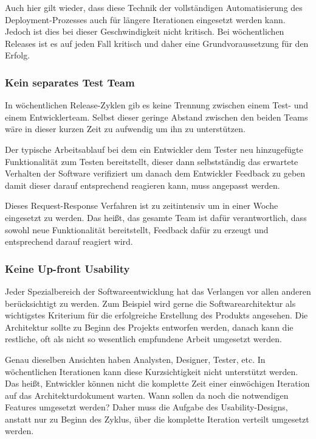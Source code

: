 Auch hier gilt wieder, dass diese Technik der vollständigen Automatisierung des Deployment-Prozesses auch für längere Iterationen eingesetzt werden kann. Jedoch ist dies bei dieser Geschwindigkeit nicht kritisch. Bei wöchentlichen Releases ist es auf jeden Fall kritisch und daher eine Grundvoraussetzung für den Erfolg.

\subsubsection{Kein separates Test Team}
In wöchentlichen Release-Zyklen gib es keine Trennung zwischen einem Test- und einem Entwicklerteam. Selbst dieser geringe Abstand zwischen den beiden Teams wäre in dieser kurzen Zeit zu aufwendig um ihn zu unterstützen. 

Der typische Arbeitsablauf bei dem ein Entwickler dem Tester neu hinzugefügte Funktionalität zum Testen bereitstellt, dieser dann selbstständig das erwartete Verhalten der Software verifiziert um danach dem Entwickler Feedback zu geben damit dieser darauf entsprechend reagieren kann, muss angepasst werden. 

Dieses Request-Response Verfahren ist zu zeitintensiv um in einer Woche eingesetzt zu werden. Das heißt, das gesamte Team ist dafür verantwortlich, dass sowohl neue Funktionalität bereitstellt, Feedback dafür zu erzeugt und entsprechend darauf reagiert wird.

\subsubsection{Keine Up-front Usability}
Jeder Spezialbereich der Softwareentwicklung hat das Verlangen vor allen anderen berücksichtigt zu werden. Zum Beispiel wird gerne die Softwarearchitektur als wichtigstes Kriterium für die erfolgreiche Erstellung des Produkts angesehen. Die Architektur sollte zu Beginn des Projekts entworfen werden, danach kann die restliche, oft als nicht so wesentlich empfundene Arbeit umgesetzt werden. 

Genau dieselben Ansichten haben Analysten, Designer, Tester, etc. In wöchentlichen Iterationen kann diese Kurzsichtigkeit nicht unterstützt werden. Das heißt, Entwickler können nicht die komplette Zeit einer einwöchigen Iteration auf das Architekturdokument warten. Wann sollen da noch die notwendigen Features umgesetzt werden? 
Daher muss die Aufgabe des Usability-Designs, anstatt nur zu Beginn des Zyklus, über die komplette Iteration verteilt umgesetzt werden.

